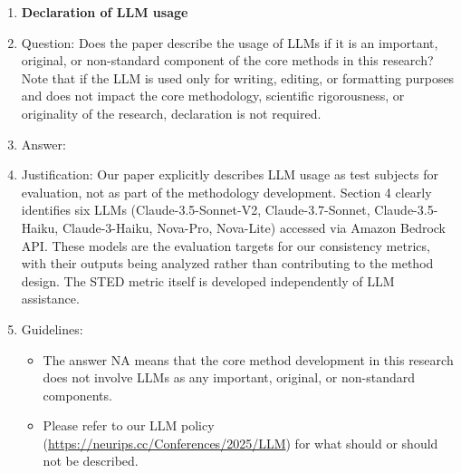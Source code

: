 \documentclass{article}
\begin{document}
\begin{enumerate}
\item {\bf Declaration of LLM usage}
    \item[] Question: Does the paper describe the usage of LLMs if it is an important, original, or non-standard component of the core methods in this research? Note that if the LLM is used only for writing, editing, or formatting purposes and does not impact the core methodology, scientific rigorousness, or originality of the research, declaration is not required.
    \item[] Answer: \answerYes{} %
    \item[] Justification: \justification Our paper explicitly describes LLM usage as test subjects for evaluation, not as part of the methodology development. Section 4 clearly identifies six LLMs (Claude-3.5-Sonnet-V2, Claude-3.7-Sonnet, Claude-3.5-Haiku, Claude-3-Haiku, Nova-Pro, Nova-Lite) accessed via Amazon Bedrock API. These models are the evaluation targets for our consistency metrics, with their outputs being analyzed rather than contributing to the method design. The STED metric itself is developed independently of LLM assistance.{}
    \item[] Guidelines:
    \begin{itemize}
        \item The answer NA means that the core method development in this research does not involve LLMs as any important, original, or non-standard components.
        \item Please refer to our LLM policy (\url{https://neurips.cc/Conferences/2025/LLM}) for what should or should not be described.
    \end{itemize}

\end{enumerate}
\end{document}

